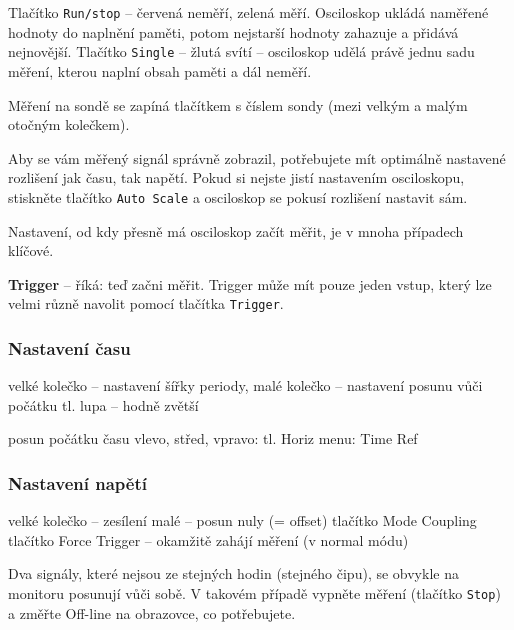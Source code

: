 Tlačítko \texttt{Run/stop} -- červená neměří, zelená měří. Osciloskop ukládá naměřené hodnoty do naplnění paměti, potom nejstarší hodnoty zahazuje a přidává nejnovější. 
Tlačítko \texttt{Single} -- žlutá svítí -- osciloskop udělá právě jednu sadu měření, kterou naplní obsah paměti a dál neměří. 

Měření na sondě se zapíná tlačítkem s  číslem sondy (mezi velkým a malým otočným kolečkem).

Aby se vám měřený signál správně zobrazil, potřebujete mít optimálně nastavené rozlišení jak času, tak napětí. %
Pokud si nejste jistí  nastavením osciloskopu, stiskněte tlačítko \texttt{Auto Scale} a osciloskop se pokusí rozlišení nastavit sám. 





Nastavení, od kdy přesně má osciloskop začít měřit, je v mnoha případech klíčové. 


\textbf{Trigger} -- říká: teď začni měřit. Trigger může mít pouze jeden vstup, který lze velmi různě navolit pomocí tlačítka \texttt{Trigger}.
 


\subsubsection{Nastavení času}
 
velké kolečko -- nastavení šířky periody, 
malé kolečko -- nastavení posunu vůči počátku 
tl. lupa -- hodně zvětší 

posun počátku času vlevo, střed, vpravo: tl. Horiz menu: Time Ref 

\subsubsection{Nastavení napětí}

velké kolečko -- zesílení 
malé -- posun nuly (= offset)
tlačítko Mode Coupling %
tlačítko Force Trigger -- okamžitě zahájí měření (v normal módu) 

Dva signály, které nejsou ze stejných hodin (stejného čipu), se obvykle na monitoru posunují vůči sobě. V takovém případě vypněte 
měření (tlačítko \texttt{Stop}) a změřte Off-line na obrazovce, co potřebujete.



